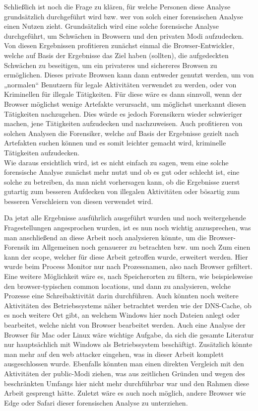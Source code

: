 Schließlich ist noch die Frage zu klären, für welche Personen diese Analyse grundsätzlich durchgeführt wird bzw. wer von solch einer forensischen Analyse einen Nutzen zieht. Grundsätzlich wird eine solche forensische Analyse durchgeführt, um Schwächen in Browsern und den privaten Modi aufzudecken. Von diesen Ergebnissen profitieren zunächst einmal die Browser-Entwickler, welche auf Basis der Ergebnisse das Ziel haben (sollten), die aufgedeckten Schwächen zu beseitigen, um ein privateres und sichereres Browsen zu ermöglichen. Dieses private Browsen kann dann entweder genutzt werden, um von „normalen“ Benutzern für legale Aktivitäten verwendet zu werden, oder von Kriminellen für illegale Tätigkeiten. Für diese wäre es dann sinnvoll, wenn der Browser möglichst wenige Artefakte verursacht, um möglichst unerkannt diesen Tätigkeiten nachzugehen. Dies würde es jedoch Forensikern wieder schwieriger machen, jene Tätigkeiten aufzudecken und nachzuweisen. Auch profitieren von solchen Analysen die Forensiker, welche auf Basis der Ergebnisse gezielt nach Artefakten suchen können und es somit leichter gemacht wird, kriminelle Tätigkeiten aufzudecken. \\
Wie daraus ersichtlich wird, ist es nicht einfach zu sagen, wem eine solche forensische Analyse zunächst mehr nutzt und ob es gut oder schlecht ist, eine solche zu betreiben, da man nicht vorhersagen kann, ob die Ergebnisse zuerst gutartig zum besseren Aufdecken von illegalen Aktivitäten oder bösartig zum besseren Verschleiern von diesen verwendet wird. 

Da jetzt alle Ergebnisse ausführlich ausgeführt wurden und noch weitergehende Fragestellungen angesprochen wurden, ist es nun noch wichtig anzusprechen, was man anschließend an diese Arbeit noch analysieren könnte, um die Browser-Forensik im Allgemeinen noch genauerer zu betrachten bzw. um noch 
Zum einen kann der scope, welcher für diese Arbeit getroffen wurde, erweitert werden. Hier wurde beim Process Monitor nur nach Prozessnamen, also nach Browser gefiltert. Eine weitere Möglichkeit wäre es, nach Speicherorten zu filtern, wie beispielsweise den browser-typischen common locations, und dann zu analysieren, welche Prozesse eine Schreibaktivität darin durchführen. Auch könnten noch weitere Aktivitäten des Betriebssystems näher betrachtet werden wie der DNS-Cache, ob es noch weitere Ort gibt, an welchem Windows hier noch Dateien anlegt oder bearbeitet, welche nicht von Browser bearbeitet werden. Auch eine Analyse der Browser für Mac oder Linux wäre wichtige Aufgabe, da sich die gesamte Literatur nur hauptsächlich mit Windows als Betriebssystem beschäftigt. Zusätzlich könnte man mehr auf den web attacker eingehen, was in dieser Arbeit komplett ausgeschlossen wurde. Ebenfalls könnten man einen direkten Vergleich mit den Aktivitäten der public-Modi ziehen, was aus zeitlichen Gründen und wegen des beschränkten Umfangs hier nicht mehr durchführbar war und den Rahmen diese Arbeit gesprengt hätte. Zuletzt wäre es auch noch möglich, andere Browser wie Edge oder Safari dieser forensischen Analyse zu unterziehen.


